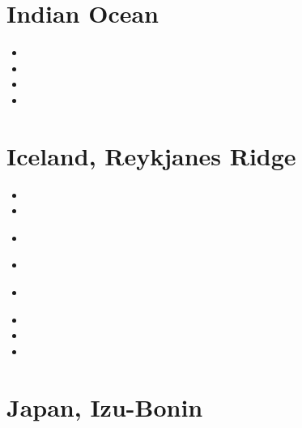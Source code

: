 \section{Indian Ocean} 

\begin{small}
\begin{itemize}
\item[\nineteenseventythree]
\item[\twothousandtwelve]
\item[\twothousandseventeen]
\item[\twothousandtwentytwo] 
\end{itemize}
\end{small}

\section{Iceland, Reykjanes Ridge}

\begin{small}
\begin{itemize}
\item[\nineteeneightynine]
\item[\nineteenninetysix]
\item[\nineteenninetynine]
\\ 
\item[\twothousand]
\item[\twothousandseventeen]
 \\
\item[\twothousandnineteen]
\item[\twothousandtwenty]
\item[\twothousandtwentytwo]
\end{itemize}
\end{small} 


\section{Japan, Izu-Bonin} 

